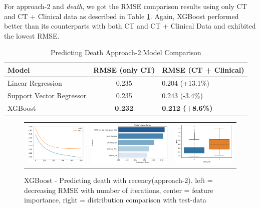 For approach-2 and \textit{death}, we got the RMSE comparison results using only CT and CT + Clinical data as described in Table \ref{tab:death_approach_2}. Again, XGBoost performed better than its counterparts with both CT and CT + Clinical Data and exhibited the lowest RMSE. 
\begin{table}[H]
\centering
\begin{tabular}{|l|c|l|}
\hline
\textbf{Model}           & \textbf{RMSE (only CT)} & \textbf{RMSE (CT + Clinical)} \\ \hline
Linear Regression        & 0.235                   & 0.204 (+13.1\%)               \\ \hline
Support Vector Regressor & 0.235                   & 0.243 (-3.4\%)                \\ \hline
XGBoost                  & \textbf{0.232}                   & \textbf{0.212 (+8.6\%)}                \\ \hline
\end{tabular}
\caption{Predicting Death Approach-2:Model Comparison}
\label{tab:death_approach_2}
\end{table}

\begin{figure}[H]
	\def\imgwidth{0.5\linewidth}
	\centering
	\begin{tabular}{ccc}
		\includegraphics[width=0.3\linewidth]{images/death/a_2_comp_rmse.png} &
		\includegraphics[width=0.3\linewidth]{images/death/a_2_comp_feat_imp.png} &
		\includegraphics[width=0.3\linewidth]{images/death/a_2_comp_w_test.png} \\
	\end{tabular}
	\caption{XGBoost - Predicting death with recency(approach-2). left = decreasing RMSE with number of iterations, center = feature importance, right = distribution comparison with test-data}
	\label{fig:death_results_a_2}
\end{figure}

